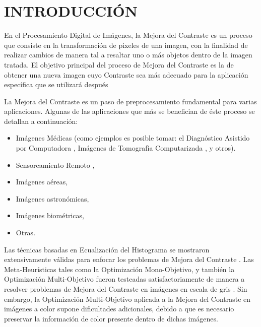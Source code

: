 \chapter{INTRODUCCIÓN}

En el Procesamiento Digital de Imágenes, la Mejora del Contraste es un proceso que consiste en la transformación de pixeles de una imagen, con la finalidad de realizar cambios de manera tal a resaltar uno o más objetos dentro de la imagen tratada. El objetivo principal del proceso de Mejora del Contraste es la de obtener una nueva imagen cuyo Contraste sea más adecuado para la aplicación específica que se utilizará después \cite{gonzalez02a}

La Mejora del Contraste es un paso de preprocesamiento fundamental para varias aplicaciones. Algunas de las aplicaciones que más se benefician de éste proceso se detallan a continuación:

\begin{itemize}
	\item Imágenes Médicas (como ejemplos es posible tomar: el Diagnóstico Asistido por Computadora \cite{doi2007computer}, Imágenes de Tomografía Computarizada \cite{doi:10.1056/NEJM199303113281008}, y otros).
	\item Sensoreamiento Remoto \cite{lillesand2014remote},

	\item Imágenes aéreas,

	\item Imágenes astronómicas,

	\item Imágenes biométricas,

	\item Otras.
	
\end{itemize}



Las técnicas basadas en Ecualización del Histograma se mostraron extensivamente válidas para enfocar los problemas de Mejora del Contraste \cite{pizer1987adaptive,zuiderveld1994contrast,580378}. %
Las Meta-Heurísticas tales como la Optimización Mono-Objetivo, y también la Optimización Multi-Objetivo fueron testeadas satisfactoriamente de manera a resolver problemas de Mejora del Contraste en imágenes en escala de gris \cite{morepso,more2015parameter,812529,HOSEINI2013879}. Sin embargo, la Optimización Multi-Objetivo aplicada a la Mejora del Contraste en imágenes a color supone dificultades adicionales, debido a que es necesario preservar la información de color presente dentro de dichas imágenes.

